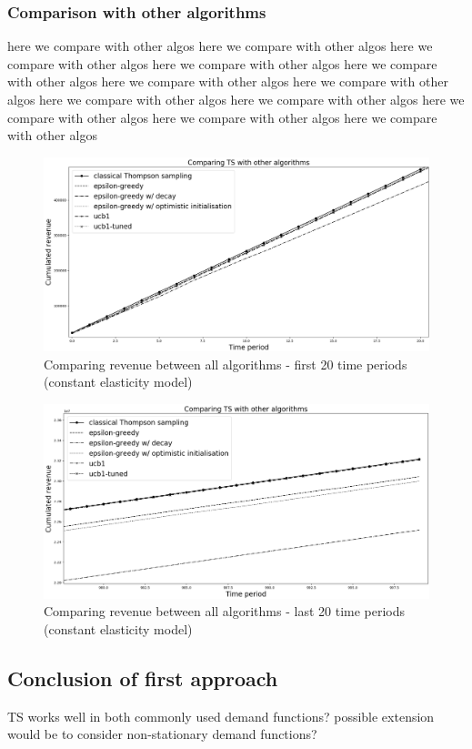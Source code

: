 \documentclass[a4paper]{article}
\begin{document}
\subsubsection{Comparison with other algorithms}
here we compare with other algos here we compare with other algos here we compare with other algos here we compare with other algos here we compare with other algos here we compare with other algos here we compare with other algos here we compare with other algos here we compare with other algos here we compare with other algos here we compare with other algos here we compare with other algos 
\begin{figure}[h!]
	\centering
	\includegraphics[width=1.03\textwidth]{5.png}
	\caption{\label{fig:5}Comparing revenue between all algorithms - first 20 time periods (constant elasticity model)}
\end{figure}
\begin{figure}[h!]
	\centering
	\includegraphics[width=1.03\textwidth]{6.png}
	\caption{\label{fig:6}Comparing revenue between all algorithms - last 20 time periods (constant elasticity model)}
\end{figure}
\subsection{Conclusion of first approach}
TS works well in both commonly used demand functions? possible extension would be to consider non-stationary demand functions?
\pagebreak
\end{document}
